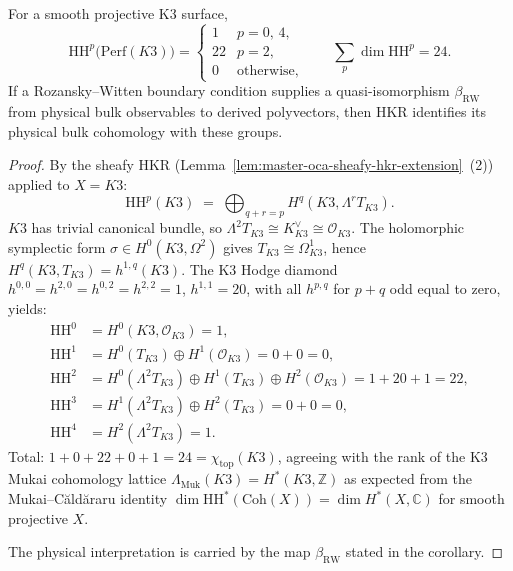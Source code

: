 \begin{corollary}
\label{cor:master-oca-rozansky-witten-k3}
For a smooth projective K3 surface,
\[
\mathrm{HH}^p\bigl(\mathrm{Perf}(K3)\bigr) =
\begin{cases}
1 & p = 0,\,4,\\
22 & p = 2,\\
0 & \text{otherwise,}
\end{cases}
\qquad\sum_p \dim \mathrm{HH}^p = 24.
\]
If a Rozansky--Witten boundary condition supplies a quasi-isomorphism
$\beta_{\mathrm{RW}}$ from physical bulk observables to derived
polyvectors, then HKR identifies its physical bulk cohomology with
these groups.
\end{corollary}

\begin{proof}
By the sheafy HKR
\textup{(}Lemma~\ref{lem:master-oca-sheafy-hkr-extension}~\textup{(2)}\textup{)}
applied to $X = K3$:
\[
\mathrm{HH}^p(K3) \;=\; \bigoplus_{q + r = p} H^q(K3, \Lambda^r T_{K3}).
\]
$K3$ has trivial canonical bundle, so $\Lambda^2 T_{K3} \cong
K_{K3}^{\vee} \cong \mathcal O_{K3}$. The holomorphic symplectic form
$\sigma \in H^0(K3, \Omega^2)$ gives $T_{K3} \cong \Omega^1_{K3}$,
hence $H^q(K3, T_{K3}) = h^{1, q}(K3)$. The K3 Hodge diamond
$h^{0,0} = h^{2,0} = h^{0,2} = h^{2,2} = 1$, $h^{1,1} = 20$, with
all $h^{p, q}$ for $p + q$ odd equal to zero, yields:
\begin{align*}
\mathrm{HH}^0 &= H^0(K3, \mathcal O_{K3}) = 1,\\
\mathrm{HH}^1 &= H^0(T_{K3}) \oplus H^1(\mathcal O_{K3}) = 0 + 0 = 0,\\
\mathrm{HH}^2 &= H^0(\Lambda^2 T_{K3}) \oplus H^1(T_{K3}) \oplus
                H^2(\mathcal O_{K3}) = 1 + 20 + 1 = 22,\\
\mathrm{HH}^3 &= H^1(\Lambda^2 T_{K3}) \oplus H^2(T_{K3}) = 0 + 0 = 0,\\
\mathrm{HH}^4 &= H^2(\Lambda^2 T_{K3}) = 1.
\end{align*}
Total: $1 + 0 + 22 + 0 + 1 = 24 = \chi_{\mathrm{top}}(K3)$, agreeing
with the rank of the K3 Mukai cohomology lattice
$\Lambda_{\mathrm{Muk}}(K3) = H^*(K3, \mathbb Z)$ as expected from the
Mukai--C{\u a}ld{\u a}raru identity
$\dim \mathrm{HH}^*(\mathrm{Coh}(X)) = \dim H^*(X, \mathbb C)$ for
smooth projective $X$.

The physical interpretation is carried by the map
$\beta_{\mathrm{RW}}$ stated in the corollary.
\end{proof}

